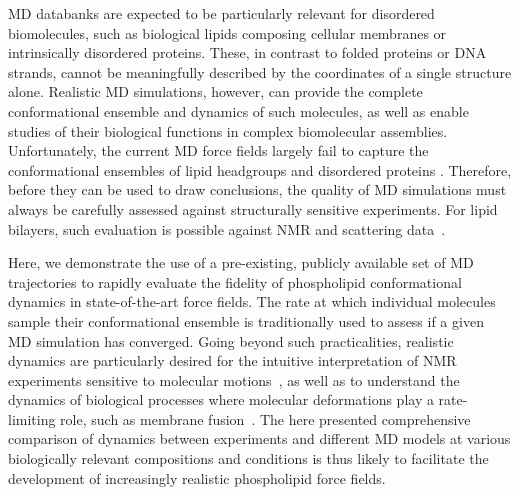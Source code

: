 \documentclass[journal=jcisd8,manuscript=article,layout=twocolumn]{achemso}
\begin{document}
MD databanks are expected to be particularly relevant for disordered biomolecules, such as
biological lipids composing cellular membranes or intrinsically disordered proteins.
These, in contrast to folded proteins or DNA strands,
cannot be meaningfully described by the coordinates of a single structure alone.
Realistic MD simulations, however,
can provide the complete conformational ensemble and dynamics of such molecules, as well as
enable studies of their biological functions in complex biomolecular assemblies.
Unfortunately, the current MD force fields largely fail to capture the conformational ensembles of lipid headgroups and
disordered proteins \cite{botan15,Antila:2019a,robustelli18,henriques18,virtanen20}.
Therefore, before they can be used to draw conclusions,
the quality of MD simulations
must always be carefully assessed against structurally sensitive experiments.
For lipid bilayers, such evaluation is possible against NMR and scattering data~\cite{Ollila:2016a}.

Here, we demonstrate the use of a pre-existing, publicly available set of MD trajectories to
rapidly evaluate the fidelity of phospholipid conformational dynamics in state-of-the-art force fields.
The rate at which individual molecules sample their conformational ensemble
is traditionally used to assess if a given MD simulation has converged.
Going beyond such practicalities,
realistic dynamics are particularly desired for the intuitive interpretation of NMR %
experiments sensitive to molecular motions~\cite{Antila:2020a},
as well as to understand the dynamics of biological processes where
molecular deformations play a rate-limiting role, such as membrane fusion~\cite{han17}.
%
%
The here presented comprehensive comparison of dynamics between experiments and different MD models %
at various biologically relevant compositions and conditions is thus likely to facilitate the development of increasingly realistic phospholipid force fields. 
\end{document}
